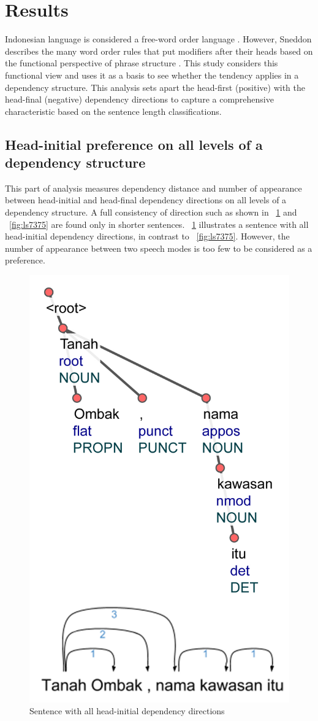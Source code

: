 \documentclass[10pt, a4paper, conference, compsocconf]{IEEEtran}
\begin{document}
\section{Results}
 
Indonesian language is considered a free-word order language \cite{sneddon2010indonesian}. However, Sneddon describes the many word order rules that put modifiers after their heads based on the functional perspective of phrase structure \cite{sneddon2010indonesian}. This study considers this functional view and uses it as a basis to see whether the tendency applies in a dependency structure. This analysis sets apart the head-first (positive) with the head-final (negative) dependency directions to capture a comprehensive characteristic based on the sentence length classifications. 

\subsection{Head-initial preference on all levels of a dependency structure}

This part of analysis measures dependency distance and number of appearance between head-initial and head-final dependency directions on all levels of a dependency structure. A full consistency of direction such as shown in \pic~\ref{fig:ts6841} and \pic~\ref{fig:ls7375} are found only in shorter sentences. \pic~\ref{fig:ts6841} illustrates a sentence with all head-initial dependency directions, in contrast to \pic~\ref{fig:ls7375}. However, the number of appearance between two speech modes is too few to be considered as a preference.

\begin{figure}
\centering
\includegraphics[width=0.45\linewidth] {pics/ts6841.jpg} 
	\caption{Sentence with all head-initial dependency directions}
	\label{fig:ts6841} 
\end{figure}
\end{document}
